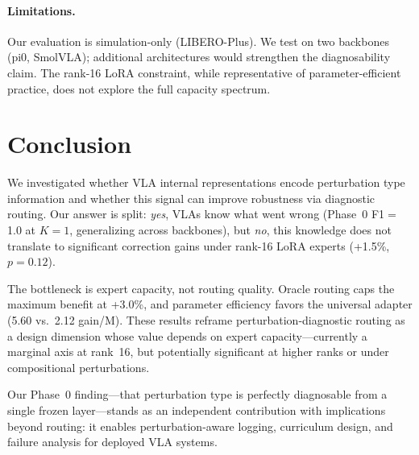 \documentclass[letterpaper]{article}
\newcommand{\libeplus}{LIBERO-Plus}
\begin{document}
\paragraph{Limitations.}
Our evaluation is simulation-only (\libeplus{}).
We test on two backbones (pi0, SmolVLA); additional architectures would strengthen the diagnosability claim.
The rank-16 LoRA constraint, while representative of parameter-efficient practice, does not explore the full capacity spectrum.

\section{Conclusion}
\label{sec:conclusion}

We investigated whether VLA internal representations encode perturbation type information and whether this signal can improve robustness via diagnostic routing.
Our answer is split: \emph{yes}, VLAs know what went wrong (Phase~0 F1$=$1.0 at $K{=}1$, generalizing across backbones), but \emph{no}, this knowledge does not translate to significant correction gains under rank-16 LoRA experts (+1.5\%, $p{=}0.12$).

The bottleneck is expert capacity, not routing quality.
Oracle routing caps the maximum benefit at +3.0\%, and parameter efficiency favors the universal adapter (5.60 vs.\ 2.12 gain/M).
These results reframe perturbation-diagnostic routing as a design dimension whose value depends on expert capacity---currently a marginal axis at rank~16, but potentially significant at higher ranks or under compositional perturbations.

Our Phase~0 finding---that perturbation type is perfectly diagnosable from a single frozen layer---stands as an independent contribution with implications beyond routing: it enables perturbation-aware logging, curriculum design, and failure analysis for deployed VLA systems.

\end{document}
